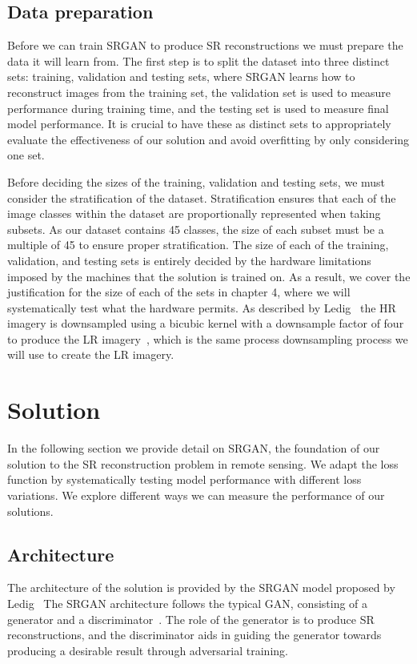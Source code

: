 \subsection{Data preparation}\label{subsec:data_preparation}
Before we can train SRGAN to produce SR reconstructions we must prepare the data it will learn from. The first step is to split the dataset into three distinct sets: training, validation and testing sets, where SRGAN learns how to reconstruct images from the training set, the validation set is used to measure performance during training time, and the testing set is used to measure final model performance. It is crucial to have these as distinct sets to appropriately evaluate the effectiveness of our solution and avoid overfitting by only considering one set.

Before deciding the sizes of the training, validation and testing sets, we must consider the stratification of the dataset. Stratification ensures that each of the image classes within the dataset are proportionally represented when taking subsets. As our dataset contains 45 classes, the size of each subset must be a multiple of 45 to ensure proper stratification. The size of each of the training, validation, and testing sets is entirely decided by the hardware limitations imposed by the machines that the solution is trained on. As a result, we cover the justification for the size of each of the sets in chapter 4, where we will systematically test what the hardware permits. As described by Ledig \etal\, the HR imagery is downsampled using a bicubic kernel with a downsample factor of four to produce the LR imagery~\cite{srgan}, which is the same process downsampling process we will use to create the LR imagery.

\section{Solution}
In the following section we provide detail on SRGAN, the foundation of our solution to the SR reconstruction problem in remote sensing. We adapt the loss function by systematically testing model performance with different loss variations. We explore different ways we can measure the performance of our solutions.

\subsection{Architecture}\label{subsec:architecture}
The architecture of the solution is provided by the SRGAN model proposed by Ledig \etal\ The SRGAN architecture follows the typical GAN, consisting of a generator and a discriminator~\cite{srgan,gan}. The role of the generator is to produce SR reconstructions, and the discriminator aids in guiding the generator towards producing a desirable result through adversarial training.


